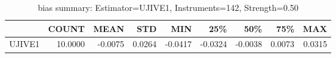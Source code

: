 \begin{table}[ht]
\centering
\caption{bias summary: Estimator=UJIVE1, Instruments=142, Strength=0.50}
\begin{tabular}{lrrrrrrrr}
\toprule
 & COUNT & MEAN & STD & MIN & 25\% & 50\% & 75\% & MAX \\
\midrule
UJIVE1 & 10.0000 & -0.0075 & 0.0264 & -0.0417 & -0.0324 & -0.0038 & 0.0073 & 0.0315 \\
\bottomrule
\end{tabular}
\end{table}
